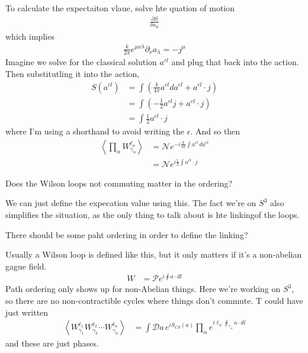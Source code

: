 To calculate the expectaiton vlaue,
solve hte quation of motion
\begin{align}
    \frac{\partial S}{\delta a_\mu}
\end{align}
which implies
\begin{align}
    \frac{k}{2\pi} e^{\mu\nu\lambda} \partial_\nu a_\lambda = -j^\mu
\end{align}
Imagine we solve for the classical solution $a^{cl}$ and plug that back into the
action.
Then substitutling it into the action,
\begin{align}
    S\left( a^{cl} \right)
    &=
    \int \left( 
    \frac{k}{4\pi} a^{cl} da^{cl} 
    + a^{cl}\cdot j
    \right)\\
    &=
    \int\left( 
    -\frac{1}{2} a^{cl} j
    + a^{cl}\cdot j
    \right)\\
    &=
    \int \frac{1}{2} a^{cl}\cdot j
\end{align}
where I'm using a shorthand to avoid writing the $\epsilon$.
And so then
\begin{align}
    \left\langle
    \prod_{\alpha} W_{\gamma_\alpha}^{\ell_\alpha}
    \right\rangle
    &=
    \mathcal{N}
    e^{-i \frac{k}{4\pi} \int a^{cl} \, da^{cl}}\\
    &=
    \mathcal{N}
    e^{i\frac{1}{2}\int a^{cl}\cdot j}
\end{align}

\begin{question}
    Does the Wilson loops not commuting matter in the ordering?
\end{question}
We can just define the expecation value using this.
The fact we're on $S^3$ also simplifies the situation,
as the only thing to talk about is hte linkingof the loops.


\begin{question}
    There should be some paht ordering in order to define the linking?
\end{question}
Usually a Wilson loop is defined like this,
but it only matters if it's a non-abelian gague field.
\begin{align}
    W &= \mathcal{P} e^{i\oint a\cdot dl}
\end{align}
Path ordering only shows up for non-Abelian things.
Here we're working on $S^3$,
so there are no non-contractible cycles where things don't commute.
T could have just written
\begin{align}
    \left\langle
    W_{\gamma_1}^{\ell_1}
    W_{\gamma_2}^{\ell_2}
    \cdots
    W_{\gamma_n}^{\ell_n}
    \right\rangle
    &=
    \int \mathcal{D} a\,
    e^{i S_{CS}(a)}
    \prod_{\alpha}
    e^{i
    \ell_\alpha \oint_{\gamma_\alpha} a\cdot dl
    }
\end{align}
and these are just phases.

